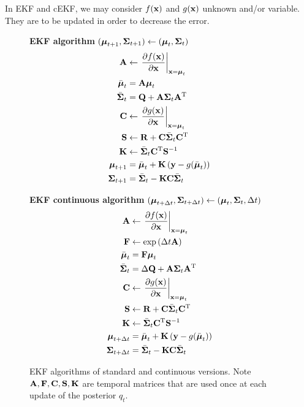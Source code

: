 \documentclass{article}
\begin{document}
In EKF and cEKF, we may consider $f({\bf x})$ and $g({\bf x})$ unknown and/or variable. 
They are to be updated in order to decrease the error.

\begin{figure}
\begin{itembox}[l]{\bf EKF algorithm}
$({\boldsymbol{\mu}}_{t+1}, {\boldsymbol{\Sigma}}_{t+1}) \leftarrow ({\boldsymbol{\mu}}_t, {\boldsymbol{\Sigma}}_t)$
\begin{align*}
{\bf A} &\leftarrow \left. \frac{\partial f({\bf x})}{\partial {\bf x}} \right|_{{\bf x} = {\boldsymbol{\mu}}_t} \\
\bar{{\boldsymbol{\mu}}}_t &= {\bf A} {\boldsymbol{\mu}}_t \\
\bar{{\boldsymbol{\Sigma}}}_t &= {\bf Q} + {\bf A} {\boldsymbol{\Sigma}}_t {\bf A}{{}^{\rm T}}\\ 
{\bf C} &\leftarrow \left. \frac{\partial g({\bf x})}{\partial {\bf x}} \right|_{{\bf x} = {\boldsymbol{\mu}}_t} \\
{\bf S} &\leftarrow {\bf R} + {\bf C} \bar{{\boldsymbol{\Sigma}}}_t {\bf C}{{}^{\rm T}}\\
{\bf K} &\leftarrow \bar{{\boldsymbol{\Sigma}}}_t {\bf C}{{}^{\rm T}} {\bf S}^{-1}\\
{\boldsymbol{\mu}}_{t+1} &= \bar{{\boldsymbol{\mu}}}_t + {\bf K} \left( {\bf y}-g(\bar{{\boldsymbol{\mu}}}_t ) \right)\\
{\boldsymbol{\Sigma}}_{t+1} &= \bar{{\boldsymbol{\Sigma}}}_t - {\bf K} {\bf C} \bar{{\boldsymbol{\Sigma}}}_t
\end{align*}
\end{itembox}

\begin{itembox}[l]{\bf EKF continuous algorithm}
$({\boldsymbol{\mu}}_{t+\Delta t}, {\boldsymbol{\Sigma}}_{t+\Delta t}) \leftarrow ({\boldsymbol{\mu}}_t, {\boldsymbol{\Sigma}}_t, \Delta t)$
\begin{align*}
{\bf A} &\leftarrow \left. \frac{\partial f({\bf x})}{\partial {\bf x}} \right|_{{\bf x} = {\boldsymbol{\mu}}_t} \\
{\bf F} &\leftarrow \exp \left( \Delta t {\bf A} \right) \\
\bar{{\boldsymbol{\mu}}}_t &= {\bf F} {\boldsymbol{\mu}}_t \\
\bar{{\boldsymbol{\Sigma}}}_t &= \Delta{\bf Q} + {\bf A} {\boldsymbol{\Sigma}}_t {\bf A}{{}^{\rm T}}\\ 
{\bf C} &\leftarrow \left. \frac{\partial g({\bf x})}{\partial {\bf x}} \right|_{{\bf x} = {\boldsymbol{\mu}}_t} \\
{\bf S} &\leftarrow {\bf R} + {\bf C} \bar{{\boldsymbol{\Sigma}}}_t {\bf C}{{}^{\rm T}}\\
{\bf K} &\leftarrow \bar{{\boldsymbol{\Sigma}}}_t {\bf C}{{}^{\rm T}} {\bf S}^{-1}\\
{\boldsymbol{\mu}}_{t+\Delta t} &= \bar{{\boldsymbol{\mu}}}_t + {\bf K} \left( {\bf y}-g(\bar{{\boldsymbol{\mu}}}_t ) \right)\\
{\boldsymbol{\Sigma}}_{t+\Delta t} &= \bar{{\boldsymbol{\Sigma}}}_t - {\bf K} {\bf C} \bar{{\boldsymbol{\Sigma}}}_t
\end{align*}
\end{itembox}
\caption{EKF algorithms of standard and continuous versions.
Note ${\bf A}, {\bf F}, {\bf C}, {\bf S}, {\bf K}$ are temporal matrices
that are used once at each update of the posterior $q_t$.}
\label{EKFalg}
\end{figure}
\end{document}

